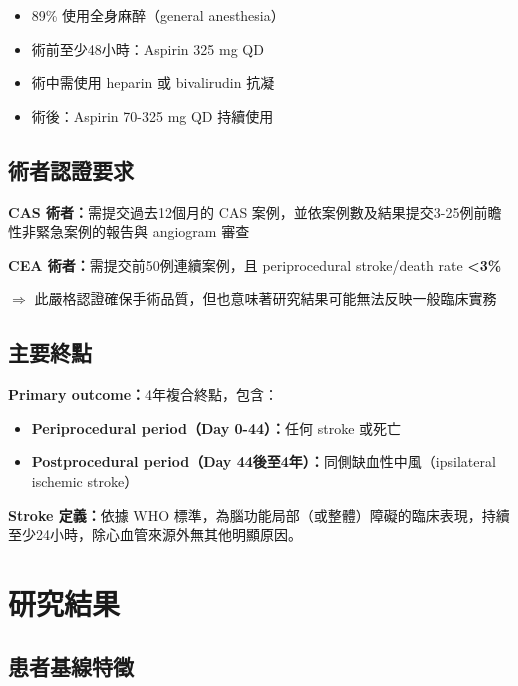 \documentclass[12pt,a4paper]{article}
\begin{document}
\begin{itemize}
    \item 89\% 使用全身麻醉（general anesthesia）
    \item 術前至少48小時：Aspirin 325 mg QD
    \item 術中需使用 heparin 或 bivalirudin 抗凝
    \item 術後：Aspirin 70-325 mg QD 持續使用
\end{itemize}

\subsection{術者認證要求}

\begin{tcolorbox}[colback=emergency_red!5!white,colframe=emergency_red,title=\textbf{重要：嚴格的術者品質管控}]
\textbf{CAS 術者：}需提交過去12個月的 CAS 案例，並依案例數及結果提交3-25例前瞻性非緊急案例的報告與 angiogram 審查

\textbf{CEA 術者：}需提交前50例連續案例，且 periprocedural stroke/death rate \textbf{<3\%}

$\Rightarrow$ 此嚴格認證確保手術品質，但也意味著研究結果可能無法反映一般臨床實務
\end{tcolorbox}

\subsection{主要終點}

\textbf{Primary outcome：}4年複合終點，包含：
\begin{itemize}
    \item \textbf{Periprocedural period（Day 0-44）：}任何 stroke 或死亡
    \item \textbf{Postprocedural period（Day 44後至4年）：}同側缺血性中風（ipsilateral ischemic stroke）
\end{itemize}

\textbf{Stroke 定義：}依據 WHO 標準，為腦功能局部（或整體）障礙的臨床表現，持續至少24小時，除心血管來源外無其他明顯原因。

\section{研究結果}

\subsection{患者基線特徵}
\end{document}
